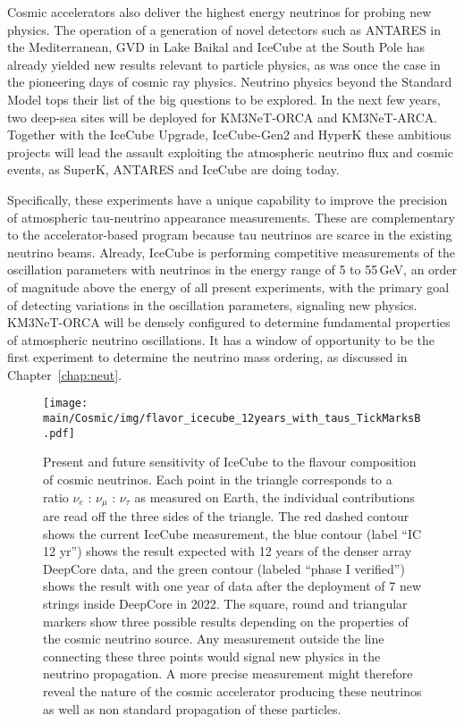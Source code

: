 
Cosmic accelerators also deliver the highest energy neutrinos for probing new physics. The operation of a generation of novel detectors such as ANTARES in the Mediterranean, GVD in Lake Baikal and IceCube at the South Pole has already yielded new results relevant to particle physics, as was once the case in the pioneering days of cosmic ray physics. 
Neutrino physics beyond the Standard Model tops their list of the big questions to be explored. In the next few years, two deep-sea sites will be deployed for KM3NeT-ORCA and KM3NeT-ARCA. Together with the IceCube Upgrade, IceCube-Gen2 and HyperK these ambitious projects will lead the assault exploiting the atmospheric neutrino flux and cosmic events, as SuperK, ANTARES and IceCube are doing today. 

Specifically, these experiments have a unique capability to improve the precision of atmospheric tau-neutrino appearance measurements. These are complementary to the accelerator-based program because tau neutrinos are scarce in the existing neutrino beams. Already, IceCube is performing competitive measurements of the oscillation parameters with neutrinos in the energy range of 5 to 55\,GeV, an order of magnitude above the energy of all present experiments, with the primary goal of detecting variations in the oscillation parameters, signaling new physics. KM3NeT-ORCA will be densely configured to determine fundamental properties of atmospheric neutrino oscillations. It has a window of opportunity to be the first experiment to determine the neutrino mass ordering, as discussed in Chapter~\ref{chap:neut}.

\begin{figure} [htbp!]
\begin{center}
\texttt{[image: \\main/Cosmic/img/flavor\_icecube\_12years\_with\_taus\_TickMarksB.pdf]}
\vspace*{-3mm}
\caption{\label{fig:nutriangle} 
Present and future sensitivity of IceCube to the flavour composition of cosmic neutrinos. 
Each point in the triangle corresponds to a ratio
$\nu_e$  : $\nu_\mu$  : $\nu_\tau$ as measured on Earth, the individual contributions are read off the three sides of the triangle.
The red dashed contour shows the current IceCube measurement, the blue contour (label ``IC 12 yr'') shows the result expected with 12 years of the denser array DeepCore data, and the green contour (labeled ``phase I verified'') shows the result with one year of data after the deployment of 7 new strings inside DeepCore in 2022. The square, round and triangular markers show three possible results depending on the properties of the cosmic neutrino source. Any measurement outside the line connecting these three points would signal new physics in the neutrino propagation. A more precise measurement might therefore reveal the nature of the cosmic accelerator producing these neutrinos as well as non standard propagation of these particles.
}
\end{center}
\vspace*{-1cm}
\end{figure}

